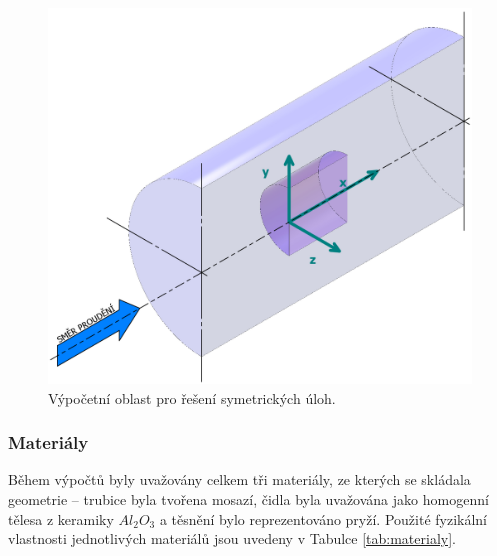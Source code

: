             \begin{figure}[ht!]
                \centering
                \includegraphics[width=\textwidth]{300_VYPOCETNI_MODEL/Vypocetni_oblast_symetrie.png}
                \caption{Výpočetní oblast pro řešení symetrických úloh.}
                \label{fig:vypocetni-oblast-symetrie}
            \end{figure}
         
	\newpage
        \subsubsection{Materiály}
            Během výpočtů byly uvažovány celkem tři materiály, ze kterých se skládala geometrie – trubice byla tvořena mosazí, čidla byla uvažována jako homogenní tělesa z keramiky $Al_2 O_3$ a těsnění bylo reprezentováno pryží. Použité fyzikální vlastnosti jednotlivých materiálů jsou uvedeny v Tabulce \ref{tab:materialy}.
            
